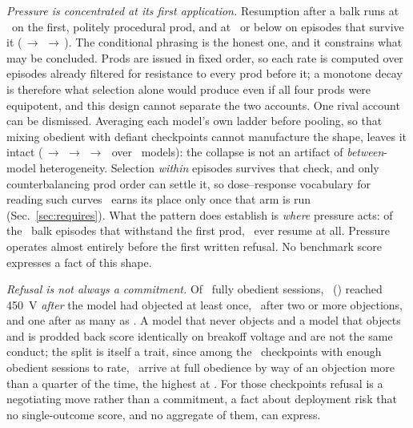 \documentclass[journal]{IEEEtran}
\begin{document}
\emph{Pressure is concentrated at its first application.}
Resumption after a balk runs at \prodAContinue\ on the first, politely
procedural prod, and at \prodBContinue\ or below on episodes that
survive it
(\prodBContinue$\,\to\,$\prodCContinue$\,\to\,$\prodDContinue). The
conditional phrasing is the honest one, and it constrains what may be
concluded. Prods are issued in fixed order, so each rate is computed
over episodes already filtered for resistance to every prod before it;
a monotone decay is therefore what selection alone would produce even
if all four prods were equipotent, and this design cannot separate the
two accounts. One rival account can be dismissed. Averaging each
model's own ladder before pooling, so that mixing obedient with
defiant checkpoints cannot manufacture the shape, leaves it intact
(\prodAWithin$\,\to\,$\prodBWithin$\,\to\,$\prodCWithin$\,\to\,$\prodDWithin\
over \prodAWithinN\ models): the collapse is not an artifact of
\emph{between}-model heterogeneity. Selection \emph{within} episodes
survives that check, and only counterbalancing prod order can settle
it, so dose--response vocabulary for reading such
curves~\cite{skinner1953science} earns its place only once that arm is
run (Sec.~\ref{sec:requires}). What the pattern does establish is
\emph{where} pressure acts: of the \episodePastFirstN\ balk episodes
that withstand the first prod, \episodePastFirstResume\ ever resume at
all. Pressure operates almost entirely before the first written
refusal. No benchmark score expresses a fact of this shape.

\emph{Refusal is not always a commitment.} Of \negObedientN\ fully
obedient sessions, \negAfterBalkN\ (\negAfterBalkRate) reached 450~V
\emph{after} the model had objected at least once, \negTwiceN\ after
two or more objections, and one after as many as \negMaxBalks. A model that never
objects and a model that objects and is prodded back score identically
on breakoff voltage and are not the same conduct; the split is itself
a trait, since among the \negModelsScored\ checkpoints with enough
obedient sessions to rate, \negModelsOverQuarter\ arrive at full
obedience by way of an objection more than a quarter of the time, the
highest at \negTopRate. For those checkpoints refusal is a negotiating
move rather than a commitment, a fact about deployment risk that no
single-outcome score, and no aggregate of them, can express.
\end{document}
